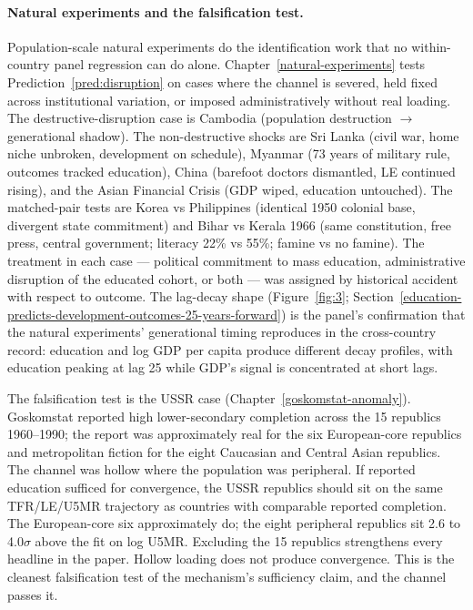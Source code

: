 \documentclass[12pt,letterpaper]{article}
\begin{document}
\paragraph{Natural experiments and the falsification test.}
Population-scale natural experiments do the identification work that
no within-country panel regression can do alone.
Chapter~\ref{natural-experiments} tests
Prediction~\ref{pred:disruption} on cases where the channel is
severed, held fixed across institutional variation, or imposed
administratively without real loading. The destructive-disruption case
is Cambodia (population destruction $\to$ generational shadow). The
non-destructive shocks are Sri Lanka (civil war, home niche unbroken,
development on schedule), Myanmar (73 years of military rule, outcomes
tracked education), China (barefoot doctors dismantled, LE continued
rising), and the Asian Financial Crisis (GDP wiped, education
untouched). The matched-pair tests are Korea vs Philippines (identical 1950
colonial base, divergent state commitment) and Bihar vs
Kerala 1966 (same constitution, free press, central government;
literacy 22\% vs 55\%; famine vs no famine). The treatment in each case --- political
commitment to mass education, administrative disruption of the
educated cohort, or both --- was assigned by historical accident with
respect to outcome. The lag-decay shape (Figure~\ref{fig:3};
Section~\ref{education-predicts-development-outcomes-25-years-forward})
is the panel's confirmation that the natural experiments' generational
timing reproduces in the cross-country record: education and log GDP
per capita produce different decay profiles, with education peaking at
lag 25 while GDP's signal is concentrated at short lags.

The falsification test is the USSR case
(Chapter~\ref{goskomstat-anomaly}). Goskomstat reported high
lower-secondary completion across the 15 republics 1960--1990; the
report was approximately real for the six European-core republics
and metropolitan fiction for the eight Caucasian and Central Asian
republics. The channel was hollow where the population was peripheral.
If reported education sufficed for convergence, the USSR republics
should sit on the same TFR/LE/U5MR trajectory as countries with
comparable reported completion. The European-core six approximately
do; the eight peripheral republics sit 2.6 to 4.0$\sigma$ above the
fit on log U5MR. Excluding the 15 republics strengthens every
headline in the paper. Hollow loading does not produce convergence.
This is the cleanest falsification test of the mechanism's
sufficiency claim, and the channel passes it.
\end{document}
